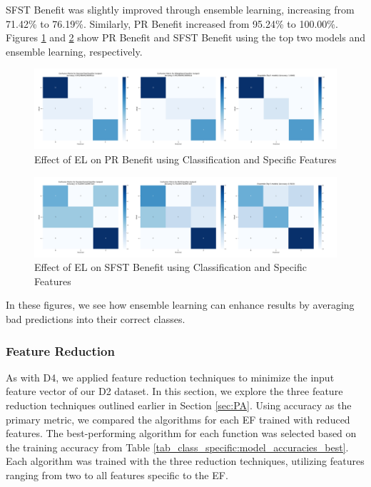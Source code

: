 \documentclass[12pt,letterpaper]{article}
\begin{document}
\ac{SFST} Benefit was slightly improved through ensemble learning, increasing from 71.42\% to 76.19\%.
Similarly, \ac{PR} Benefit increased from 95.24\% to 100.00\%.
Figures \ref{fig_class_specific:EL_PR} and \ref{fig_class_specific:EL_SFST_ben} show \ac{PR} Benefit and \ac{SFST} Benefit using the top two models and ensemble learning, respectively.

\begin{figure}
    \centering
    \includegraphics[width=0.95\linewidth]{class_specific_section/top_2_and_ensemble_confusion_matrices_PR_Benefit.png}
    \caption{Effect of EL on PR Benefit using Classification and Specific Features}
    \label{fig_class_specific:EL_PR}
\end{figure}

\begin{figure}
    \centering
    \includegraphics[width=0.95\linewidth]{class_specific_section/top_2_and_ensemble_confusion_matrices_SFST_Benefit.png}
    \caption{Effect of EL on SFST Benefit using Classification and Specific Features}
    \label{fig_class_specific:EL_SFST_ben}
\end{figure}

In these figures, we see how ensemble learning can enhance results by averaging bad predictions into their correct classes.

\subsubsection{Feature Reduction}\label{sec:class_specific_featred}
As with D4, we applied feature reduction techniques to minimize the input feature vector of our D2 dataset.
In this section, we explore the three feature reduction techniques outlined earlier in Section \ref{sec:PA}.
Using accuracy as the primary metric, we compared the algorithms for each \ac{EF} trained with reduced features.
The best-performing algorithm for each function was selected based on the training accuracy from Table \ref{tab_class_specific:model_accuracies_best}.
Each algorithm was trained with the three reduction techniques, utilizing features ranging from two to all features specific to the \ac{EF}.
\end{document}
